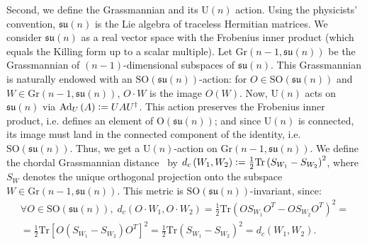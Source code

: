 \documentclass[referee,sn-mathphys-num]{sn-jnl}%
\theoremstyle{thmstyleone}%
\theoremstyle{thmstyletwo}%
\theoremstyle{remark}
\theoremstyle{thmstylethree}%
\newcommand{\defeq}{\vcentcolon=}
\begin{document}
Second, we define the Grassmannian and its $ \mathrm{U} \left( n \right) $ action. Using the physicists' convention, $ \mathfrak{su} \left( n \right) $ is the Lie algebra of traceless Hermitian matrices. We consider $ \mathfrak{su} \left( n \right) $ as a real vector space with the Frobenius inner product (which equals the Killing form up to a scalar multiple). Let $ \mathrm{Gr} \left( n-1, \mathfrak{su} \left( n \right) \right) $ be the Grassmannian of $ \left( n-1 \right) $-dimensional subspaces of $ \mathfrak{su} \left( n \right) $. This Grassmannian is naturally endowed with an $ \mathrm{SO} \left( \mathfrak{su} \left( n \right) \right) $-action: for $O \in \mathrm{SO} \left( \mathfrak{su} \left( n \right) \right) $ and $W \in \mathrm{Gr} \left( n-1, \mathfrak{su} \left( n \right) \right) $, $ O \cdot W $ is the image $ O \left( W \right) $. 
Now, $ \mathrm{U} \left( n \right) $ acts on $ \mathfrak{su} \left( n \right) $ via $ \mathrm{Ad}_U \left( A \right) \defeq U A U^\dagger $. This action preserves the Frobenius inner product, i.e. defines an element of $ \mathrm{O} \left( \mathfrak{su} \left( n \right) \right) $; and since $ \mathrm{U} \left( n \right) $ is connected, its image must land in the connected component of the identity, i.e. $ \mathrm{SO} \left( \mathfrak{su} \left( n \right) \right) $. Thus, we get a $ \mathrm{U} \left( n \right) $-action on $ \mathrm{Gr} \left( n-1, \mathfrak{su} \left( n \right) \right) $.
We define the chordal Grassmannian distance~\cite{bengtsson2007three} by $ d_c \left( W_1, W_2 \right) \defeq \frac{1}{2} \mathrm{Tr} \left( S_{W_1} -S_{W_2} \right)^2 $, where $ S_W $ denotes the unique orthogonal projection onto the subspace $ W \in \mathrm{Gr} \left( n-1, \mathfrak{su} \left( n \right) \right) $. This metric is $ \mathrm{SO} \left( \mathfrak{su} \left( n \right) \right) $-invariant, since:
\begin{multline*}
	\forall O \in \mathrm{SO} \left( \mathfrak{su} \left( n \right) \right), \; d_c \left( O \cdot W_1, O \cdot W_2 \right) = \frac{1}{2} \mathrm{Tr} \left( O S_{W_1} O^T -O S_{W_2} O^T \right)^2 = \\
	= \frac{1}{2} \mathrm{Tr} \left[ O \left( S_{W_1}- S_{W_2} \right) O^T \right]^2 = \frac{1}{2} \mathrm{Tr} \left( S_{W_1} -S_{W_2} \right)^2 = d_c \left( W_1, W_2 \right) .
\end{multline*}
\end{document}
